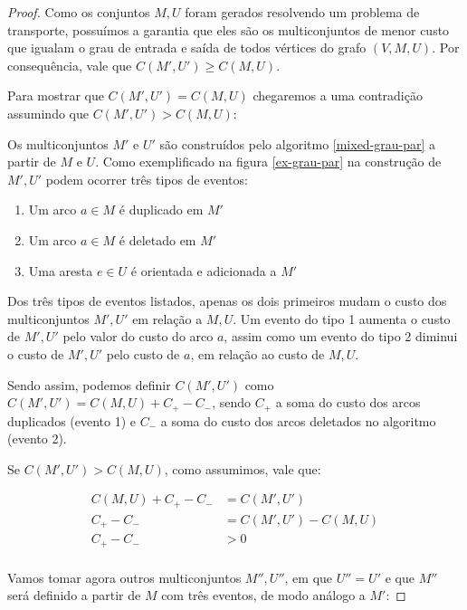     \begin{proof}
        Como os conjuntos $M, U$ foram gerados resolvendo um problema de transporte, possuímos a garantia que eles são os multiconjuntos de menor custo que igualam o grau de entrada e saída de todos vértices do grafo $(V, M, U)$. 
        Por consequência, vale que $C(M', U') \geq C(M, U)$. 

        Para mostrar que $C(M', U') = C(M, U)$ chegaremos a uma contradição assumindo que $C(M', U') > C(M, U)$:

        Os multiconjuntos $M'$ e $U'$ são construídos pelo algoritmo \ref{mixed-grau-par} a partir de $M$ e $U$. 
        Como exemplificado na figura \ref{ex-grau-par} na construção de $M', U'$ podem ocorrer três tipos de eventos:

        \begin{enumerate}
            \item Um arco $a \in M$ é duplicado em $M'$
            \item Um arco $a \in M$ é deletado em $M'$
            \item Uma aresta $e \in U$ é orientada e adicionada a $M'$
        \end{enumerate}
        
        Dos três tipos de eventos listados, apenas os dois primeiros mudam o custo dos multiconjuntos $M', U'$ em relação a $M, U$.
        Um evento do tipo 1 aumenta o custo de $M', U'$ pelo valor do custo do arco $a$, assim como um evento do tipo 2 diminui o custo de $M', U'$ pelo custo de $a$, em relação ao custo de $M, U$.

        Sendo assim, podemos definir $C(M', U')$ como $C(M', U') = C(M, U) + C_+ - C_-$, sendo $C_+$ a soma do custo dos arcos duplicados (evento 1) e $C_-$ a soma do custo dos arcos deletados no algoritmo (evento 2).

        Se $C(M', U') > C(M, U)$, como assumimos, vale que:

        \begin{align*}
            C(M, U) + C_+ - C_- &= C(M', U') \\
            C_+ - C_- &= C(M', U') - C(M, U) \\
            C_+ - C_- &> 0 \\ 
        \end{align*}

        Vamos tomar agora outros multiconjuntos $M'', U''$, em que $U'' = U'$ e que $M''$ será definido a partir de $M$ com três eventos, de modo análogo a $M'$:
        

\end{proof}
